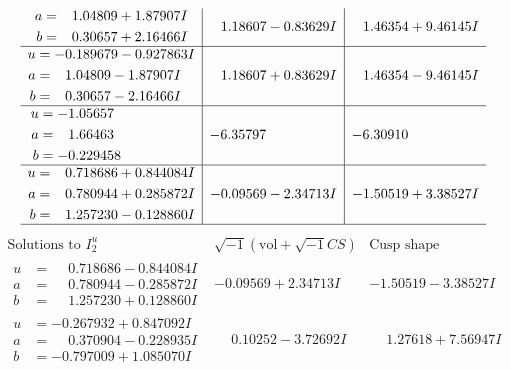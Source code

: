 \documentclass[1p]{elsarticle_modified}
\theoremstyle{definition}
\newcommand{\I}{\sqrt{-1}}
\begin{document}
$$\begin{array}{c|c|c}
\begin{aligned}
a &= \phantom{-}1.04809 + 1.87907 I \\
b &= \phantom{-}0.30657 + 2.16466 I\end{aligned}
 & \phantom{-}1.18607 - 0.83629 I & \phantom{-}1.46354 + 9.46145 I \\ \hline\begin{aligned}
u &= -0.189679 - 0.927863 I \\
a &= \phantom{-}1.04809 - 1.87907 I \\
b &= \phantom{-}0.30657 - 2.16466 I\end{aligned}
 & \phantom{-}1.18607 + 0.83629 I & \phantom{-}1.46354 - 9.46145 I \\ \hline\begin{aligned}
u &= -1.05657\phantom{ +0.000000I} \\
a &= \phantom{-}1.66463\phantom{ +0.000000I} \\
b &= -0.229458\phantom{ +0.000000I}\end{aligned}
 & -6.35797\phantom{ +0.000000I} & -6.30910\phantom{ +0.000000I} \\ \hline\begin{aligned}
u &= \phantom{-}0.718686 + 0.844084 I \\
a &= \phantom{-}0.780944 + 0.285872 I \\
b &= \phantom{-}1.257230 - 0.128860 I\end{aligned}
 & -0.09569 - 2.34713 I & -1.50519 + 3.38527 I\\
 \hline 
 \end{array}$$\newpage$$\begin{array}{c|c|c}  
\text{Solutions to }I^u_{2}& \I (\text{vol} + \sqrt{-1}CS) & \text{Cusp shape}\\
 \hline 
\begin{aligned}
u &= \phantom{-}0.718686 - 0.844084 I \\
a &= \phantom{-}0.780944 - 0.285872 I \\
b &= \phantom{-}1.257230 + 0.128860 I\end{aligned}
 & -0.09569 + 2.34713 I & -1.50519 - 3.38527 I \\ \hline\begin{aligned}
u &= -0.267932 + 0.847092 I \\
a &= \phantom{-}0.370904 - 0.228935 I \\
b &= -0.797009 + 1.085070 I\end{aligned}
 & \phantom{-}0.10252 - 3.72692 I & \phantom{-}1.27618 + 7.56947 I \\ \hline\begin{aligned}

\end{aligned}
\end{array}$$
\end{document}
